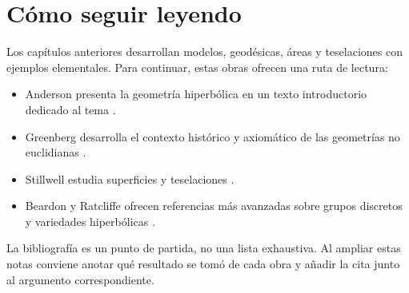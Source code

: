 \section{Cómo seguir leyendo}

Los capítulos anteriores desarrollan modelos, geodésicas, áreas y teselaciones con ejemplos elementales. Para continuar, estas obras ofrecen una ruta de lectura:

\begin{itemize}
  \item Anderson presenta la geometría hiperbólica en un texto introductorio dedicado al tema \cite{anderson2005}.
  \item Greenberg desarrolla el contexto histórico y axiomático de las geometrías no euclidianas \cite{greenberg2008}.
  \item Stillwell estudia superficies y teselaciones \cite{stillwell1992}.
  \item Beardon y Ratcliffe ofrecen referencias más avanzadas sobre grupos discretos y variedades hiperbólicas \cite{beardon1983,ratcliffe2006}.
\end{itemize}

\begin{remark}
La bibliografía es un punto de partida, no una lista exhaustiva. Al ampliar estas notas conviene anotar qué resultado se tomó de cada obra y añadir la cita junto al argumento correspondiente.
\end{remark}
